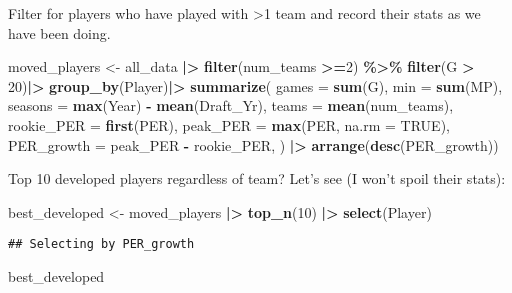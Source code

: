 \documentclass[
]{article}
\newenvironment{Shaded}{\begin{snugshade}}{\end{snugshade}}
\newcommand{\AttributeTok}[1]{\textcolor[rgb]{0.13,0.29,0.53}{#1}}
\newcommand{\ConstantTok}[1]{\textcolor[rgb]{0.56,0.35,0.01}{#1}}
\newcommand{\DecValTok}[1]{\textcolor[rgb]{0.00,0.00,0.81}{#1}}
\newcommand{\FunctionTok}[1]{\textcolor[rgb]{0.13,0.29,0.53}{\textbf{#1}}}
\newcommand{\NormalTok}[1]{#1}
\newcommand{\OtherTok}[1]{\textcolor[rgb]{0.56,0.35,0.01}{#1}}
\newcommand{\SpecialCharTok}[1]{\textcolor[rgb]{0.81,0.36,0.00}{\textbf{#1}}}
\begin{document}
Filter for players who have played with \textgreater1 team and record
their stats as we have been doing.

\begin{Shaded}
\begin{Highlighting}[]
\NormalTok{moved\_players }\OtherTok{\textless{}{-}}\NormalTok{ all\_data }\SpecialCharTok{|\textgreater{}} \FunctionTok{filter}\NormalTok{(num\_teams }\SpecialCharTok{\textgreater{}=}\DecValTok{2}\NormalTok{) }\SpecialCharTok{\%\textgreater{}\%} \FunctionTok{filter}\NormalTok{(G }\SpecialCharTok{\textgreater{}} \DecValTok{20}\NormalTok{)}\SpecialCharTok{|\textgreater{}} \FunctionTok{group\_by}\NormalTok{(Player)}\SpecialCharTok{|\textgreater{}}
  \FunctionTok{summarize}\NormalTok{(}
    \AttributeTok{games =} \FunctionTok{sum}\NormalTok{(G),}
    \AttributeTok{min =} \FunctionTok{sum}\NormalTok{(MP),}
    \AttributeTok{seasons =} \FunctionTok{max}\NormalTok{(Year) }\SpecialCharTok{{-}} \FunctionTok{mean}\NormalTok{(Draft\_Yr),}
    \AttributeTok{teams =} \FunctionTok{mean}\NormalTok{(num\_teams),}
    \AttributeTok{rookie\_PER =} \FunctionTok{first}\NormalTok{(PER),}
    \AttributeTok{peak\_PER =} \FunctionTok{max}\NormalTok{(PER, }\AttributeTok{na.rm =} \ConstantTok{TRUE}\NormalTok{),}
    \AttributeTok{PER\_growth =}\NormalTok{ peak\_PER }\SpecialCharTok{{-}}\NormalTok{ rookie\_PER,}
\NormalTok{    ) }\SpecialCharTok{|\textgreater{}}
  \FunctionTok{arrange}\NormalTok{(}\FunctionTok{desc}\NormalTok{(PER\_growth))}
\end{Highlighting}
\end{Shaded}

Top 10 developed players regardless of team? Let's see (I won't spoil
their stats):

\begin{Shaded}
\begin{Highlighting}[]
\NormalTok{best\_developed }\OtherTok{\textless{}{-}}\NormalTok{ moved\_players }\SpecialCharTok{|\textgreater{}} 
  \FunctionTok{top\_n}\NormalTok{(}\DecValTok{10}\NormalTok{) }\SpecialCharTok{|\textgreater{}} \FunctionTok{select}\NormalTok{(Player)}
\end{Highlighting}
\end{Shaded}

\begin{verbatim}
## Selecting by PER_growth
\end{verbatim}

\begin{Shaded}
\begin{Highlighting}[]
\NormalTok{best\_developed}
\end{Highlighting}
\end{Shaded}
\end{document}
